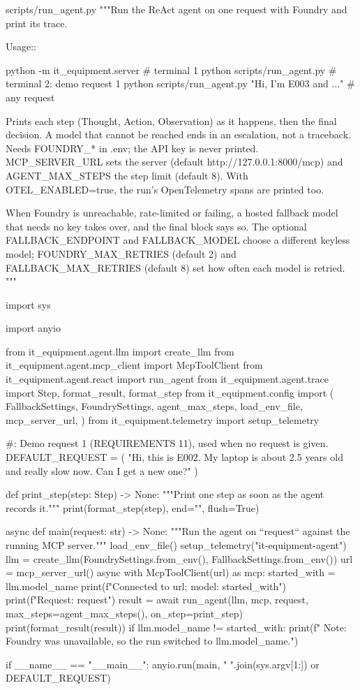 \documentclass[11pt,letterpaper]{article}
\renewcommand{\_}{\textunderscore\allowbreak}
\begin{document}
\begin{codebox}{scripts/run_agent.py}
"""Run the ReAct agent on one request with Foundry and print its trace.

Usage::

    python -m it_equipment.server                       # terminal 1
    python scripts/run_agent.py                         # terminal 2: demo request 1
    python scripts/run_agent.py "Hi, I'm E003 and ..."  # any request

Prints each step (Thought, Action, Observation) as it happens, then the final decision. A model
that cannot be reached ends in an escalation, not a traceback. Needs FOUNDRY_* in .env; the
API key is never printed. MCP_SERVER_URL sets the server (default http://127.0.0.1:8000/mcp)
and AGENT_MAX_STEPS the step limit (default 8). With OTEL_ENABLED=true, the run's
OpenTelemetry spans are printed too.

When Foundry is unreachable, rate-limited or failing, a hosted fallback model that needs no key
takes over, and the final block says so. The optional FALLBACK_ENDPOINT and FALLBACK_MODEL
choose a different keyless model; FOUNDRY_MAX_RETRIES (default 2) and FALLBACK_MAX_RETRIES
(default 8) set how often each model is retried.
"""

import sys

import anyio

from it_equipment.agent.llm import create_llm
from it_equipment.agent.mcp_client import McpToolClient
from it_equipment.agent.react import run_agent
from it_equipment.agent.trace import Step, format_result, format_step
from it_equipment.config import (
    FallbackSettings,
    FoundrySettings,
    agent_max_steps,
    load_env_file,
    mcp_server_url,
)
from it_equipment.telemetry import setup_telemetry

#: Demo request 1 (REQUIREMENTS 11), used when no request is given.
DEFAULT_REQUEST = (
    "Hi, this is E002. My laptop is about 2.5 years old and really slow now. Can I get a new one?"
)


def print_step(step: Step) -> None:
    """Print one step as soon as the agent records it."""
    print(format_step(step), end="\n\n", flush=True)


async def main(request: str) -> None:
    """Run the agent on ``request`` against the running MCP server."""
    load_env_file()
    setup_telemetry("it-equipment-agent")
    llm = create_llm(FoundrySettings.from_env(), FallbackSettings.from_env())
    url = mcp_server_url()
    async with McpToolClient(url) as mcp:
        started_with = llm.model_name
        print(f"Connected to {url}; model: {started_with}")
        print(f"Request: {request}\n")
        result = await run_agent(llm, mcp, request, max_steps=agent_max_steps(), on_step=print_step)
    print(format_result(result))
    if llm.model_name != started_with:
        print(f"  Note: Foundry was unavailable, so the run switched to {llm.model_name}.")


if __name__ == "__main__":
    anyio.run(main, " ".join(sys.argv[1:]) or DEFAULT_REQUEST)
\end{codebox}
\end{document}
